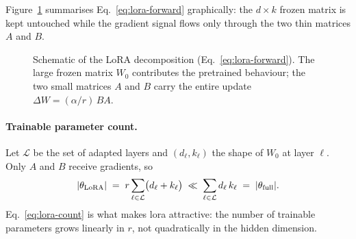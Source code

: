 \documentclass[12pt, a4paper]{report}
\DeclarePairedDelimiter{\abs}{\lvert}{\rvert}
\begin{document}
Figure~\ref{fig:lora-schematic} summarises Eq.~\eqref{eq:lora-forward}
graphically: the \(d \times k\) frozen matrix is kept untouched while the
gradient signal flows only through the two thin matrices \(A\) and \(B\).

\begin{figure}[H]
  \centering
  \caption[LoRA decomposition]{Schematic of the LoRA decomposition
           (Eq.~\eqref{eq:lora-forward}). The large frozen matrix \(W_0\)
           contributes the pretrained behaviour; the two small matrices
           \(A\) and \(B\) carry the entire update
           \(\Delta W = (\alpha/r)\,BA\).}
  \label{fig:lora-schematic}
\end{figure}

\paragraph{Trainable parameter count.} Let \(\mathcal{L}\) be the set of
adapted layers and \((d_\ell, k_\ell)\) the shape of \(W_0\) at layer
\(\ell\). Only \(A\) and \(B\) receive gradients, so
\begin{equation}
  \abs{\theta_{\mathrm{LoRA}}}
    \;=\; r \sum_{\ell \in \mathcal{L}} \bigl(d_\ell + k_\ell\bigr)
    \;\ll\; \sum_{\ell \in \mathcal{L}} d_\ell\,k_\ell
    \;=\; \abs{\theta_{\mathrm{full}}}.
  \label{eq:lora-count}
\end{equation}
Eq.~\eqref{eq:lora-count} is what makes \gls{lora} attractive: the number
of trainable parameters grows linearly in \(r\), not quadratically in the
hidden dimension.
\end{document}
